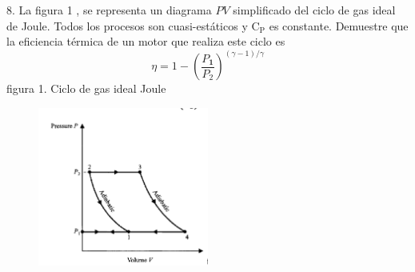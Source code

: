 8. La figura 1 , se representa un diagrama $PV$ simplificado del ciclo de gas ideal de Joule. Todos los procesos son cuasi-estáticos y $\mathrm{C_P}$ es constante. Demuestre que la eficiencia térmica de un motor que realiza este ciclo es
$$
\eta=1-\left(\frac{P_{\mathbf{1}}}{P_2}\right)^{(\gamma-1) / \gamma}
$$
figura 1. Ciclo de gas ideal Joule

\begin{figure}[h]
    \centering
    \includegraphics[width=0.5\textwidth]{diagrama.png}
    \label{fig:figura1}    
\end{figure}